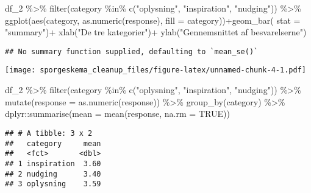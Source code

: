 \documentclass[
]{article}
\newenvironment{Shaded}{\begin{snugshade}}{\end{snugshade}}
\newcommand{\AttributeTok}[1]{\textcolor[rgb]{0.77,0.63,0.00}{#1}}
\newcommand{\ConstantTok}[1]{\textcolor[rgb]{0.00,0.00,0.00}{#1}}
\newcommand{\FunctionTok}[1]{\textcolor[rgb]{0.00,0.00,0.00}{#1}}
\newcommand{\NormalTok}[1]{#1}
\newcommand{\SpecialCharTok}[1]{\textcolor[rgb]{0.00,0.00,0.00}{#1}}
\newcommand{\StringTok}[1]{\textcolor[rgb]{0.31,0.60,0.02}{#1}}
\begin{document}
\begin{Shaded}
\begin{Highlighting}[]
\NormalTok{df\_2 }\SpecialCharTok{\%\textgreater{}\%} 
  \FunctionTok{filter}\NormalTok{(category }\SpecialCharTok{\%in\%} \FunctionTok{c}\NormalTok{(}\StringTok{"oplysning"}\NormalTok{, }\StringTok{"inspiration"}\NormalTok{, }\StringTok{"nudging"}\NormalTok{)) }\SpecialCharTok{\%\textgreater{}\%} 
  \FunctionTok{ggplot}\NormalTok{(}\FunctionTok{aes}\NormalTok{(category, }\FunctionTok{as.numeric}\NormalTok{(response), }\AttributeTok{fill =}\NormalTok{ category))}\SpecialCharTok{+}\FunctionTok{geom\_bar}\NormalTok{( }\AttributeTok{stat =} \StringTok{"summary"}\NormalTok{)}\SpecialCharTok{+} 
  \FunctionTok{xlab}\NormalTok{(}\StringTok{"De tre kategorier"}\NormalTok{)}\SpecialCharTok{+} \FunctionTok{ylab}\NormalTok{(}\StringTok{"Gennemsnittet af besvarelserne"}\NormalTok{)}
\end{Highlighting}
\end{Shaded}

\begin{verbatim}
## No summary function supplied, defaulting to `mean_se()`
\end{verbatim}

\texttt{[image: sporgeskema\_cleanup\_files/figure-latex/unnamed-chunk-4-1.pdf]}

\begin{Shaded}
\begin{Highlighting}[]
\NormalTok{df\_2 }\SpecialCharTok{\%\textgreater{}\%} 
  \FunctionTok{filter}\NormalTok{(category }\SpecialCharTok{\%in\%} \FunctionTok{c}\NormalTok{(}\StringTok{"oplysning"}\NormalTok{, }\StringTok{"inspiration"}\NormalTok{, }\StringTok{"nudging"}\NormalTok{)) }\SpecialCharTok{\%\textgreater{}\%} 
  \FunctionTok{mutate}\NormalTok{(}\AttributeTok{response =} \FunctionTok{as.numeric}\NormalTok{(response)) }\SpecialCharTok{\%\textgreater{}\%} 
  \FunctionTok{group\_by}\NormalTok{(category) }\SpecialCharTok{\%\textgreater{}\%} 
\NormalTok{  dplyr}\SpecialCharTok{::}\FunctionTok{summarise}\NormalTok{(}\AttributeTok{mean =} \FunctionTok{mean}\NormalTok{(response, }\AttributeTok{na.rm =} \ConstantTok{TRUE}\NormalTok{))}
\end{Highlighting}
\end{Shaded}

\begin{verbatim}
## # A tibble: 3 x 2
##   category     mean
##   <fct>       <dbl>
## 1 inspiration  3.60
## 2 nudging      3.40
## 3 oplysning    3.59
\end{verbatim}
\end{document}
